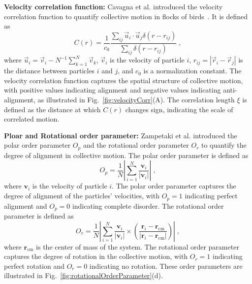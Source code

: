 \documentclass[a4paper, amsfonts, amssymb, amsmath, reprint, showkeys, showpacs, nofootinbib, twoside]{revtex4-2}
\begin{document}
\textbf{Velocity correlation function:}
Cavagna et al. introduced the velocity correlation function to quantify collective motion in flocks of birds~\cite{doi:10.1073/pnas.1005766107}. It is defined as
\begin{equation}
    C\left( r \right) =\frac{1}{c_0}\frac{\sum\nolimits_{ij}^{}{\vec{u}_i\cdot \vec{u}_j\delta \left( r-r_{ij} \right)}}{\sum\nolimits_{ij}^{}{\delta \left( r-r_{ij} \right)}}\;,
\end{equation}
where $\vec{u}_i=\vec{v}_i-N^{-1}\sum\nolimits_{k=1}^N{\vec{v}_k}$, $\vec{v}_i$ is the velocity of particle $i$, $r_{ij}=\left| \vec{r}_i-\vec{r}_j \right|$ is the distance between particles $i$ and $j$, and $c_0$ is a normalization constant. The velocity correlation function captures the spatial structure of collective motion, with positive values indicating alignment and negative values indicating anti-alignment, as illustrated in Fig.~\ref{fig:velocityCorr}(A). The correlation length $\xi$ is defined as the distance at which $C(r)$ changes sign, indicating the scale of correlated motion.

\textbf{Ploar and Rotational order parameter:} Zampetaki et al. \cite{Zampetaki2024} introduced the polar order parameter $O_p$ and the rotational order parameter $O_r$ to quantify the degree of alignment in collective motion. The polar order parameter is defined as
\begin{equation}
    O_p=\frac{1}{N}\left| \sum_{i=1}^N{\frac{\mathbf{v}_i}{\left| \mathbf{v}_i \right|}} \right|\;,
\end{equation}
where $\mathbf{v}_i$ is the velocity of particle $i$. The polar order parameter captures the degree of alignment of the particles' velocities, with $O_p=1$ indicating perfect alignment and $O_p=0$ indicating complete disorder.
The rotational order parameter is defined as
\begin{equation}
    O_r=\frac{1}{N}\left| \sum_{i=1}^N{\frac{\mathbf{v}_i}{\left| \mathbf{v}_i \right|}}\times \left( \frac{\mathbf{r}_i-\mathbf{r}_{\mathrm{cm}}}{\left| \mathbf{r}_i-\mathbf{r}_{\mathrm{cm}} \right|} \right) \right|\;,
\end{equation}
where $\mathbf{r}_{\mathrm{cm}}$ is the center of mass of the system. The rotational order parameter captures the degree of rotation in the collective motion, with $O_r=1$ indicating perfect rotation and $O_r=0$ indicating no rotation. These order parameters are illustrated in Fig.~\ref{fig:rotationalOrderParameter}(d).
\end{document}
